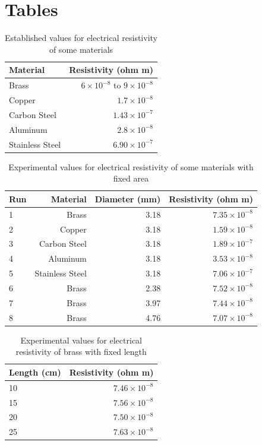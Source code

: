 \section{Tables}
%
\begin{table}[ht]
	\centering
	\begin{tabular}{|l|r|}
		\hline
		Material & Resistivity (ohm{ }\textperiodcentered{ }m) \\
		\hline
		Brass & $6 \times 10^{-8}$ to $9 \times 10^{-8}$ \\
		Copper & $1.7 \times 10^{-8}$ \\
		Carbon Steel & $1.43 \times 10^{-7}$ \\
		Aluminum & $2.8 \times 10^{-8}$ \\
		Stainless Steel & $6.90 \times 10^{-7}$ \\
		\hline
	\end{tabular}
	\caption{Established values for electrical resistivity of some materials}
	\label{table.02.established}
\end{table}
%
\begin{table}[ht]
	\centering
	\begin{tabular}{|l|r|r|r|}
		\hline
		Run & Material & Diameter (mm) & Resistivity (ohm{ }\textperiodcentered{ }m) \\
		\hline
		1 & Brass & 3.18 & $7.35 \times 10^{-8}$ \\
		2 & Copper & 3.18 & $1.59 \times 10^{-8}$ \\
		3 & Carbon Steel & 3.18 & $1.89 \times 10^{-7}$ \\
		4 & Aluminum & 3.18 & $3.53 \times 10^{-8}$ \\
		5 & Stainless Steel & 3.18 & $7.06 \times 10^{-7}$ \\
		6 & Brass & 2.38 & $7.52 \times 10^{-8}$ \\
		7 & Brass & 3.97 & $7.44 \times 10^{-8}$ \\
		8 & Brass & 4.76 & $7.07 \times 10^{-8}$ \\
		\hline
	\end{tabular}
	\caption{Experimental values for electrical resistivity of some materials with fixed area}
	\label{table.02.experimental.area}
\end{table}
%
\begin{table}[ht]
	\centering
	\begin{tabular}{|l|r|}
		\hline
		Length (cm) & Resistivity (ohm{ }\textperiodcentered{ }m) \\
		\hline
		10 & $7.46 \times 10^{-8}$ \\
		15 & $7.56 \times 10^{-8}$ \\
		20 & $7.50 \times 10^{-8}$ \\
		25 & $7.63 \times 10^{-8}$ \\
		\hline
	\end{tabular}
	\caption{Experimental values for electrical resistivity of brass with fixed length}
	\label{table.02.experimental.length}
\end{table}
%
\FloatBarrier
\newpage
